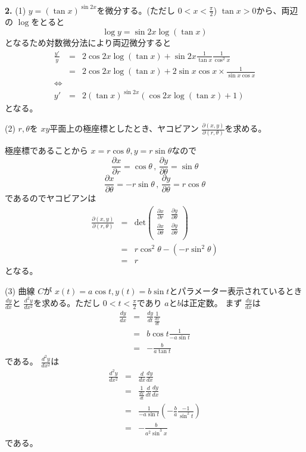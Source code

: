\documentclass[dvipdfmx,twocolumn]{jsarticle}
\begin{document}
\textbf{2.}
(1)
$y = (\tan x)^{\sin 2x}$を微分する。(ただし $0 < x < \frac{\pi}{2}$)
$\tan x > 0$から、両辺の $\log$をとると
\[
\log y = \sin 2x \log (\tan x)
\]
となるため対数微分法により両辺微分すると
\begin{eqnarray*}
\frac{y'}{y} & = & 2 \cos 2x \log (\tan x) + \sin 2x \frac{1}{\tan x} \frac{1}{\cos^2 x} \\
& = & 2 \cos 2x \log (\tan x) + 2 \sin x \cos x \times \frac{1}{\sin x \cos x} \\
\Leftrightarrow \\
y' & = & 2 (\tan x)^{\sin 2x} (\cos 2x \log (\tan x) + 1)
\end{eqnarray*}
となる。
\clearpage

(2)
$r,\theta$を $xy$平面上の極座標としたとき、ヤコビアン $\frac{\partial (x,y)}{\partial (r,\theta)}$を求める。

極座標であることから $x = r \cos \theta , y = r \sin \theta$なので
\[
\frac{\partial x}{\partial r} = \cos \theta　\, , \, \frac{\partial y}{\partial \theta} = \sin \theta
\]
\[
\frac{\partial x}{\partial \theta} = - r \sin \theta \, , \, \frac{\partial y}{\partial \theta} = r \cos \theta
\]
であるのでヤコビアンは
\begin{eqnarray*}
\frac{\partial (x,y)}{\partial (r,\theta)} & = &
\mathrm{det}
\left(
\begin{array}{cc}
\frac{\partial x}{\partial r} & \frac{\partial y}{\partial \theta} \\
\frac{\partial x}{\partial \theta} & \frac{\partial y}{\partial \theta} \\
\end{array}
\right) \\
& = & r \cos^2 \theta - (- r \sin^2 \theta)　\\
& = & r
\end{eqnarray*}
となる。

(3)
曲線 $C$が $x(t) = a \cos t , y(t) = b \sin t$とパラメーター表示されているとき $\frac{dy}{dx}$と $\frac{d^2y}{dx^2}$を求める。ただし $0 < t < \frac{\pi}{2}$であり $a$と$b$は正定数。
まず $\frac{dy}{dx}$は
\begin{eqnarray*}
  \frac{dy}{dx} & = & \frac{dy}{dt} \frac{1}{\frac{dx}{dt}} \\
  & = & b \cos t \frac{1}{- a \sin t} \\
  & = & - \frac{b}{a \tan t}
\end{eqnarray*}
である。 $\frac{d^2y}{dx^2}$は
\begin{eqnarray*}
\frac{d^2y}{dx^2} & = & \frac{d}{dx} \frac{dy}{dx} \\
& = & \frac{1}{\frac{dx}{dt}} \frac{d}{dt} \frac{dy}{dx} \\
& = & \frac{1}{- a \sin t} \left( - \frac{b}{a} \frac{-1}{\sin^2 t}  \right) \\
& = & - \frac{b}{a^2 \sin^3 x}
\end{eqnarray*}
である。 \\
\end{document}
